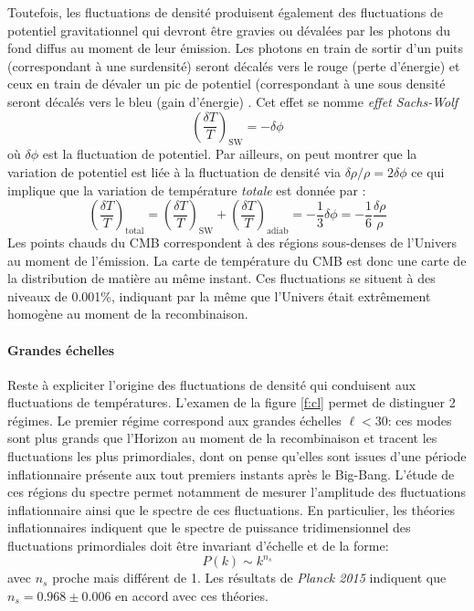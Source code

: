 Toutefois, les fluctuations de densité produisent également des fluctuations de potentiel gravitationnel qui devront être gravies ou dévalées par les photons du fond diffus au moment de leur émission. Les photons en train de sortir d'un puits (correspondant à une surdensité) seront décalés vers le rouge (perte d'énergie) et ceux en train de dévaler un pic de potentiel (correspondant à une sous densité seront décalés vers le bleu (gain d'énergie) . Cet effet se nomme \textit{effet Sachs-Wolf}
\begin{equation}
\left(\frac{\delta T}{T}\right)_\mathrm{SW}=-\delta\phi
\end{equation}
où $\delta \phi$ est la fluctuation de potentiel. Par ailleurs, on peut montrer que la variation de potentiel est liée à la fluctuation de densité via $\delta \rho/\rho=2\delta \phi$ ce qui implique que la variation de température \textit{totale} est donnée par :
\begin{equation}
\left(\frac{\delta T}{T}\right)_\mathrm{total}=\left(\frac{\delta T}{T}\right)_\mathrm{SW}+\left(\frac{\delta T}{T}\right)_\mathrm{adiab}=-\frac{1}{3}\delta \phi=-\frac{1}{6}\frac{\delta \rho}{\rho}
\end{equation}
Les points chauds du CMB correspondent à des régions sous-denses de l'Univers au moment de l'émission. La carte de température du CMB est donc une carte de la distribution de matière au même instant. Ces fluctuations se situent à des niveaux de 0.001\%, indiquant par la même que l'Univers était extrêmement homogène au moment de la recombinaison.

\paragraph{Grandes échelles} Reste à expliciter l'origine des fluctuations de densité qui conduisent aux fluctuations de températures. L'examen de la figure \ref{f:cl} permet de distinguer 2 régimes. Le premier régime correspond aux grandes échelles $\ell<30$: ces modes sont plus grands que l'Horizon au moment de la recombinaison et tracent les fluctuations les plus primordiales, dont on pense qu'elles sont issues d'une période inflationnaire présente aux tout premiers instants après le Big-Bang. L'étude de ces régions du spectre permet notamment de mesurer l'amplitude des fluctuations inflationnaire ainsi que le spectre de ces fluctuations. En particulier, les théories inflationnaires indiquent que le spectre de puissance tridimensionnel des fluctuations primordiales doit être invariant d'échelle et de la forme:
\begin{equation}
P(k)\sim k^{n_s}
\end{equation}
avec $n_s$ proche mais différent de 1. Les résultats de \textit{Planck 2015} indiquent que $n_s=0.968\pm0.006$ en accord avec ces théories.

